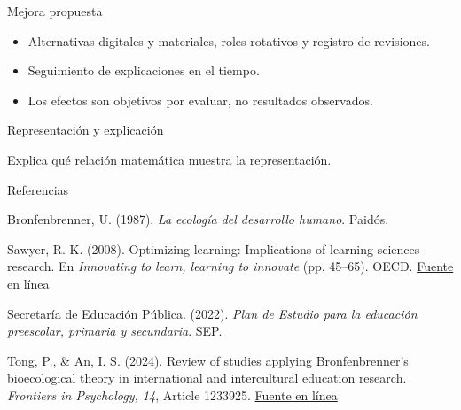 \documentclass[
	spanish,
	aspectratio=1610,
	xcolor={dvipsnames,table}
]{beamer}
\begin{document}
\begin{frame}{Mejora propuesta}
\fontsize{14}{18}\selectfont\begin{itemize}\setlength{\itemsep}{.45cm}
\item Alternativas digitales y materiales, roles rotativos y registro de revisiones.
\item Seguimiento de explicaciones en el tiempo.
\item Los efectos son objetivos por evaluar, no resultados observados.
\end{itemize}
\end{frame}
\begin{frame}{Representación y explicación}
\centering{}\par\vspace{.15cm}\small Explica qué relación matemática muestra la representación.
\end{frame}
\begin{frame}{Referencias}
\fontsize{9}{11}\selectfont\raggedright 
{\setlength{\parskip}{6pt}
\par\hangindent=1.27cm  Bronfenbrenner, U. (1987). \textit{La ecología del desarrollo humano}. Paidós.
\par\hangindent=1.27cm  Sawyer, R. K. (2008). Optimizing learning: Implications of learning sciences research. En \textit{Innovating to learn, learning to innovate} (pp. 45--65). OECD. \href{https://doi.org/10.1787/9789264039958-en}{Fuente en línea}
\par\hangindent=1.27cm  Secretaría de Educación Pública. (2022). \textit{Plan de Estudio para la educación preescolar, primaria y secundaria}. SEP.
\par\hangindent=1.27cm  Tong, P., \& An, I. S. (2024). Review of studies applying Bronfenbrenner’s bioecological theory in international and intercultural education research. \textit{Frontiers in Psychology, 14}, Article 1233925. \href{https://doi.org/10.3389/fpsyg.2023.1233925}{Fuente en línea}
}


\end{frame}
\end{document}
